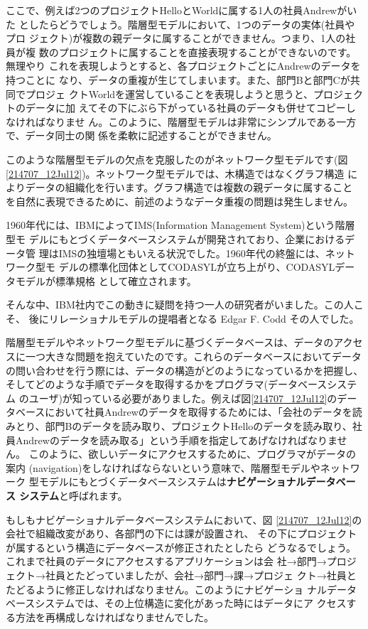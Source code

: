 ここで、例えば2つのプロジェクトHelloとWorldに属する1人の社員Andrewがいた
としたらどうでしょう。階層型モデルにおいて、1つのデータの実体(社員やプロ
ジェクト)が複数の親データに属することができません。つまり、1人の社員が複
数のプロジェクトに属することを直接表現することができないのです。無理やり
これを表現しようとすると、各プロジェクトごとにAndrewのデータを持つことに
なり、データの重複が生じてしまいます。また、部門Bと部門Cが共同でプロジェ
クトWorldを運営していることを表現しようと思うと、プロジェクトのデータに加
えてその下にぶら下がっている社員のデータも併せてコピーしなければなりませ
ん。このように、階層型モデルは非常にシンプルである一方で、データ同士の関
係を柔軟に記述することができません。


このような階層型モデルの欠点を克服したのがネットワーク型モデルです(図
\ref{214707_12Jul12})。ネットワーク型モデルでは、木構造ではなくグラフ構造
によりデータの組織化を行います。グラフ構造では複数の親データに属すること
を自然に表現できるために、前述のようなデータ重複の問題は発生しません。


1960年代には、IBMによってIMS(Information Management System)という階層型モ
デルにもとづくデータベースシステムが開発されており、企業におけるデータ管
理はIMSの独壇場ともいえる状況でした。1960年代の終盤には、ネットワーク型モ
デルの標準化団体としてCODASYLが立ち上がり、CODASYLデータモデルが標準規格
として確立されます。


そんな中、IBM社内でこの動きに疑問を持つ一人の研究者がいました。この人こそ、
後にリレーショナルモデルの提唱者となる Edgar F. Codd その人でした。


階層型モデルやネットワーク型モデルに基づくデータベースは、データのアクセ
スに一つ大きな問題を抱えていたのです。これらのデータベースにおいてデータ
の問い合わせを行う際には、データの構造がどのようになっているかを把握し、
そしてどのような手順でデータを取得するかをプログラマ(データベースシステム
のユーザ)が知っている必要がありました。例えば図\ref{214707_12Jul12}のデー
タベースにおいて社員Andrewのデータを取得するためには、「会社のデータを読
みとり、部門Bのデータを読み取り、プロジェクトHelloのデータを読み取り、社
員Andrewのデータを読み取る」という手順を指定してあげなければなりません。
このように、欲しいデータにアクセスするために、プログラマがデータの案内
(navigation)をしなければならないという意味で、階層型モデルやネットワーク
型モデルにもとづくデータベースシステムは{\bf ナビゲーショナルデータベース
システム}と呼ばれます。


もしもナビゲーショナルデータベースシステムにおいて、図
\ref{214707_12Jul12}の会社で組織改変があり、各部門の下には課が設置され、
その下にプロジェクトが属するという構造にデータベースが修正されたとしたら
どうなるでしょう。これまで社員のデータにアクセスするアプリケーションは会
社→部門→プロジェクト→社員とたどっていましたが、会社→部門→課→プロジェ
クト→社員とたどるように修正しなければなりません。このようにナビゲーショ
ナルデータベースシステムでは、その上位構造に変化があった時にはデータにア
クセスする方法を再構成しなければなりませんでした。



